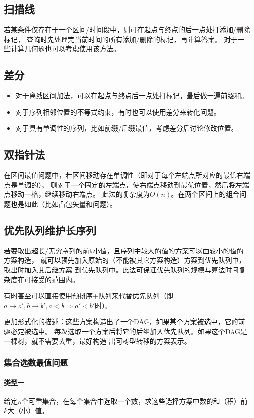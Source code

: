 \subsection{扫描线}
若某条件仅存在于一个区间/时间段中，则可在起点与终点的后一点处打添加/删除标记，
查询时先处理完当前时间的所有添加/删除的标记，再计算答案。
对于一些计算几何题也可以考虑使用该方法。
\subsection{差分}
\begin{itemize}
	\item 对于离线区间加法，可以在起点与终点后一点处打标记，最后做一遍前缀和。
	\item 对于序列相邻位置的不等式约束，有时也可以使用差分来转化问题。
	\item 对于具有单调性的序列，比如前缀/后缀最值，考虑差分后讨论修改位置。
\end{itemize}
\subsection{双指针法}
在区间最值问题中，若区间移动存在单调性（即对于每个左端点所对应的最优右端点是单调的），
则对于一个固定的左端点，使右端点移动到最优位置，然后将左端点移动一格，继续移动右端点。
此法的复杂度为$O(n)$。在两个区间上的组合问题也是如此（比如凸包矢量和问题）。
\subsection{优先队列维护长序列}\label{PQS}
若要取出超长/无穷序列的前k小值，且序列中较大的值的方案可以由较小的值的方案构造，
就可以预先加入原始的（不能被其它方案构造）方案到优先队列中，取出时加入其后继方案
到优先队列中。此法可保证优先队列的规模与算法时间复杂度在可接受的范围内。

有时甚至可以直接使用预排序+队列来代替优先队列（即$a\rightarrow a',b\rightarrow b',
	a<b\Rightarrow a'<b'$时）。

更加形式化的描述：这些方案构造出了一个DAG，如果某个方案被选中，它的前驱必定被选中。
每次选取一个方案后将它的后继加入优先队列。如果这个DAG是一棵树，就不需要去重，最好构造
出可树型转移的方案表示。

\subsubsection{集合选数最值问题}
\paragraph{类型一}
给定$n$个可重集合，在每个集合中选取一个数，求这些选择方案中数的和（积）前$k$大（小）值。

